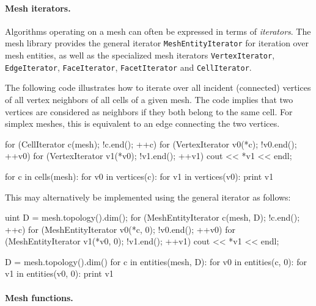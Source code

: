 \paragraph{Mesh iterators.}

Algorithms operating on a mesh can often be expressed in terms of
\emph{iterators}. The mesh library provides the general iterator
\texttt{MeshEntityIterator} for iteration over mesh entities,
as well as the specialized mesh iterators \texttt{VertexIterator},
\texttt{EdgeIterator}, \texttt{FaceIterator}, \texttt{FacetIterator}
and \texttt{Cell\-Iterator}.

The following code illustrates how to iterate over all incident
(connected) vertices of all vertex neighbors of all cells of a given
mesh. The code implies that two vertices are considered as neighbors if
they both belong to the same cell. For simplex meshes, this is equivalent
to an edge connecting the two vertices.
\begin{c++}
for (CellIterator c(mesh); !c.end(); ++c)
  for (VertexIterator v0(*c); !v0.end(); ++v0)
    for (VertexIterator v1(*v0); !v1.end(); ++v1)
      cout << *v1 << endl;
\end{c++}
\begin{python}
for c in cells(mesh):
    for v0 in vertices(c):
        for v1 in vertices(v0):
            print v1
\end{python}
This may alternatively be implemented using the general iterator
 as follows:
\begin{c++}
uint D = mesh.topology().dim();
for (MeshEntityIterator c(mesh, D); !c.end(); ++c)
  for (MeshEntityIterator v0(*c, 0); !v0.end(); ++v0)
    for (MeshEntityIterator v1(*v0, 0); !v1.end(); ++v1)
      cout << *v1 << endl;
\end{c++}
\begin{python}
D = mesh.topology().dim()
for c in entities(mesh, D):
    for v0 in entities(c, 0):
        for v1 in entities(v0, 0):
            print v1
\end{python}

\paragraph{Mesh functions.}

